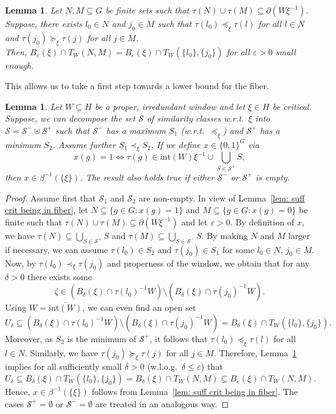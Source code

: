 \documentclass[titlepage,reqno,10pt]{amsart}
\newtheorem{lemma}[theorem]{Lemma}
\theoremstyle{definition}
\newcommand{\tm}{\subseteq}
\newcommand{\ol}[1]{\overline{#1}}
\begin{document}
\begin{lemma}\label{lem: need only check at extrema}
    Let $N,M\tm G$ be finite sets such that $\tau(N)\cup\tau(M)\tm \partial(W\xi^{-1})$.
    Suppose, there exists $l_0\in N$ and $j_0\in M$ such that $\tau(l_0)\preccurlyeq_\xi \tau(l)$ for all $l\in N$ and $\tau(j_0)\succcurlyeq_\xi \tau(j)$ for all $j\in M$.\\
    Then, $B_{\varepsilon}(\xi)\cap T_W(N,M) = B_{\varepsilon}(\xi)\cap T_W(\{l_0\},\{j_0\})$ for all $\varepsilon>0$ small enough.
\end{lemma}
This allows us to take a first step towards a lower bound for the fiber.
\begin{lemma}\label{lem: partition yields fiber element}
    Let $W\tm H$ be a proper, irredundant window and let $\xi\in H$ be critical.
    Suppose, we can decompose the set $\mathcal{S}$ of similarity classes w.r.t.\ $\xi$ into $\mathcal{S}= \mathcal{S}^-\uplus \mathcal{S}^+$ such that $\mathcal{S}^-$ has a maximum $S_1$ (w.r.t.\ $\preccurlyeq_\xi$) and $\mathcal{S}^+$ has a minimum $S_2$.
    Assume further $S_1 \prec_\xi S_2$.
    If we define $x\in\{0,1\}^G$ via
    $$ x(g) = 1 \iff \tau(g) \in \mathrm{int}(W)\xi^{-1} \cup \bigcup_{S\in \mathcal{S}^+} S,$$
    then $x\in \beta^{-1}(\{\xi\})$.
    The result also holds true if either $\mathcal{S}^-$ or $\mathcal{S}^+$ is empty.
\end{lemma}
\begin{proof}
    Assume first that $\mathcal{S}_1$ and $\mathcal{S}_2$ are non-empty.
    In view of Lemma~\ref{lem: suff crit being in fiber}, let $N\tm\{g\in G: x(g)=1\}$ and $M\tm \{g\in G: x(g)=0\}$ be finite such that $\tau(N)\cup\tau(M)\tm \partial(W\xi^{-1})$ and let $\varepsilon>0$.
    By definition of $x$, we have $\tau(N)\tm \bigcup_{S\in \mathcal{S}^+}S$ and $\tau(M)\tm \bigcup_{S\in\mathcal{S}^-}S$.
    By making $N$ and $M$ larger if necessary, we can assume $\tau(l_0) \in S_2$ and $\tau(j_0)\in S_1$ for some $l_0\in N$, $j_0\in M$.\\
    Now, by $\tau(l_0)\prec_\xi \tau(j_0)$ and properness of the window, we obtain that  for any $\delta>0$ there exists some 
    $$\zeta\in (B_{\delta}(\xi)\cap \tau(l_0)^{-1}W) \setminus (B_{\delta}(\xi)\cap \tau(j_0)^{-1}W).$$
    Using $W = \ol{\mathrm{int}(W)}$, we can even find an open set
    $$ U_\delta \tm (B_{\delta}(\xi)\cap \tau(l_0)^{-1}W) \setminus (B_{\delta}(\xi)\cap \tau(j_0)^{-1}W) = B_{\delta}(\xi)\cap T_W(\{l_0\},\{j_0\}).$$
    Moreover, as $S_2$ is the minimum of $\mathcal{S}^+$, it follows that $\tau(l_0)\preccurlyeq_\xi \tau(l)$ for all $l\in N$.
    Similarly, we have $\tau(j_0)\succcurlyeq_\xi \tau(j)$ for all $j\in M$.
    Therefore, Lemma~\ref{lem: need only check at extrema} implies for all sufficiently small $\delta>0$ (w.l.o.g.\ $\delta\leq \varepsilon$) that
    $$ U_\delta \tm B_{\delta}(\xi)\cap T_W(\{l_0\},\{j_0\}) = B_\delta(\xi)\cap T_W(N,M) \tm B_\varepsilon(\xi) \cap T_W(N,M).$$
    Hence, $x\in \beta^{-1}(\{\xi\})$ follows from Lemma~\ref{lem: suff crit being in fiber}.
    The cases $\mathcal{S}^+ = \emptyset$ or $\mathcal{S}^- = \emptyset$ are treated in an analogous way. 
\end{proof}
\end{document}
